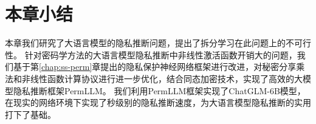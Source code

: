 \section{本章小结}
本章我们研究了大语言模型的隐私推断问题，提出了拆分学习在此问题上的不可行性。
%
针对密码学方法的大语言模型隐私推断中非线性激活函数开销大的问题，我们基于第\ref{chap:ss-perm}章提出的隐私保护神经网络框架进行改进，对秘密分享乘法和非线性函数计算协议进行进一步优化，结合同态加密技术，实现了高效的大模型隐私推断框架PermLLM。
%
我们利用PermLLM框架实现了ChatGLM-6B模型，在现实的网络环境下实现了秒级别的隐私推断速度，为大语言模型隐私推断的实用打下了基础。
